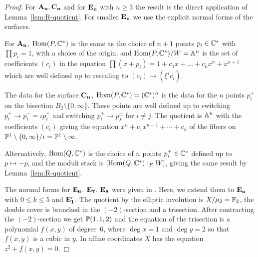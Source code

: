 \documentclass[table,x11names]{amsart}
\begin{document}
 \begin{proof}
   For ${\bf A_n}, {\bf C_n}$ and for ${\bf E_n}$ with $n\ge3$ the result is the direct
   application of Lemma~\ref{lem:R-quotient}. For smaller ${\bf E_n}$ we use
   the explicit normal forms of the surfaces.

   \smallskip   
   For ${\bf A_n}$, $\operatorname{Hom}(P,{\mathbb C}^*)$ is the same as the choice of $n+1$
   points $p_i\in{\mathbb C}^*$ with $\prod p_i=1$, with a choice of the
   origin, and $\operatorname{Hom}(P,{\mathbb C}^*)/W={\mathbb A}^n$ is the set of coefficients
   $(c_i)$ in
   the equation
   \begin{math}
     \prod (x+p_i) = 1+c_1x + \dotsc + c_nx^n+x^{n+1}
   \end{math}
   which are well defined up to rescaling to $(c_i)\to (\xi^i c_i)$.

   \smallskip
   
   The data for the surface ${\bf C_n}$, $\operatorname{Hom}(P,{\mathbb C}^*)=({\mathbb C}^*)^n$ is the
   data for the $n$ points $p_i^+$ on the bisection $B_2\setminus
   \{0,\infty\}$. These points are well defined up to switching
   $p_i^+\to p_i^-=\iota p_i^+$ and switching $p_i^+\to p_j^{\pm}$ for
   $i\ne j$. The quotient is ${\mathbb A}^n$ with the coefficients $(c_i)$
   giving the equation $x^n+c_1x^{n-1} + \dotsb +c_n$ of the fibers on
   ${\mathbb P}^1\setminus \{0,\infty\}/\iota = {\mathbb P}^1\setminus\infty$. 

   Alternatively, $\operatorname{Hom}(Q,{\mathbb C}^*)$ is the choice of $n$ points $p_i^+\in{\mathbb C}^*$
   defined up to $p\mapsto -p$, and the moduli stack is
   $[\operatorname{Hom}(Q,{\mathbb C}^*):_R W]$, giving the same result by
   Lemma~\ref{lem:R-quotient}. 

   \smallskip
   
   The normal forms for ${\bf E_6}$, ${\bf E_7}$, ${\bf E_8}$ were given in
   \cite{alexeev17ade-surfaces}. Here, we extend them to ${\bf E_n}$ with
   $0\le k\le 5$ and ${\bf E'_1}$. The quotient by the elliptic involution
   is $X/\mu_2={\mathbb F}_2$,
   the double cover is branched in the $(-2)$-section and a
   trisection.  After contracting the $(-2)$-section we get
   ${\mathbb P}(1,1,2)$ and the equation of the trisection is a polynomial
   $f(x,y)$ of degree~6, where $\deg x=1$ and $\deg y=2$ so that
   $f(x,y)$ is a cubic in $y$. In affine
   coordinates $X$ has the equation $z^2+f(x,y)=0$. 


\end{proof}
\end{document}
